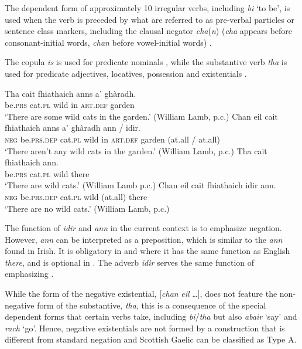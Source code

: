 \documentclass[output=paper,colorlinks,citecolor=brown]{langscibook}
\begin{document}
\begin{paperappendix}
\begin{unindented}
The dependent form of approximately 10 irregular verbs, including
\textit{bi} `to be', is used when the verb is preceded by what are referred
to as pre-verbal particles or sentence class markers, including the clausal
negator \textit{cha}(\textit{n}) (\textit{cha} appears before consonant-initial words, \textit{chan} before vowel-initial words) \citep[48--50]{Lamb2001}.

The copula \textit{is} is used for predicate nominals \citep[66--67]{Lamb2001}, while the substantive verb \textit{tha} is used for predicate adjectives, locatives, possession and existentials \citep[67--69]{Lamb2001}.
%
\begin{exe}\ex \gll Tha cait fhiathaich anns a’ ghàradh. \\
be.\textsc{prs} cat.\textsc{pl} wild in \textsc{art.def} garden \\
    \glt `There are some wild cats in the garden.' (William Lamb, p.c.)
\ex\label{ex:ieur-app-gaelic-nocatsingarden} \gll Chan eil cait fhiathaich anns a’ ghàradh {\op}ann / idir{\cp}. \\
\textsc{neg}    be.\textsc{prs}.\textsc{dep} cat.\textsc{pl} wild          in     \textsc{art}.\textsc{def} garden (at.all / at.all) \\
    \glt `There aren't any wild cats in the garden.' (William Lamb, p.c.)
\ex\label{ex:ieur-app-gaelic-yescatplease} 
\gll Tha cait fhiathaich ann. \\
        be.\textsc{prs} cat.\textsc{pl}  wild there \\
    \glt `There are wild cats.' (William Lamb p.c.)
\ex\label{ex:ieur-app-gaelic-nocatsnow} \gll Chan  eil cait fhiathaich {\op}idir{\cp}    ann. \\
\textsc{neg}    be.\textsc{prs.dep}  cat.\textsc{pl} wild           (at.all) there \\
    \glt `There are no wild cats.' (William Lamb, p.c.)
\end{exe}

The function of \textit{idir} and \textit{ann} in the current context is to emphasize negation. However, \textit{ann} can be interpreted as a preposition, which is similar to the \textit{ann} found in Irish. It is obligatory in  and  where it has the same function as English \textit{there}, and is optional in . The adverb \textit{idir} serves the same function of emphasizing .  

While the form of the negative existential, [\textit{chan} \textit{eil} …],
does not feature the non-negative form of the substantive, \textit{tha},
this is a consequence of the special dependent forms that certain verbs
take, including \textit{bi}/\textit{tha} but also \textit{abair} `say' and \textit{rach} ‘go'. Hence, negative existentials are not formed by a construction that is different from standard negation and Scottish Gaelic can be classified as Type A. 

\end{unindented}
\end{paperappendix}
\end{document}
